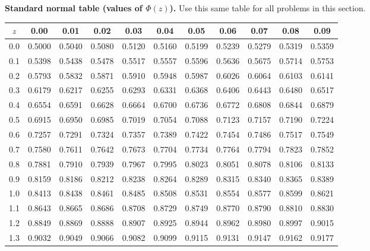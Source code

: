 



\noindent\textbf{Standard normal table (values of \(\Phi(z)\)).} Use this same table for all problems in this section.
\begin{center}
\begin{tabular}{c|cccccccccc}
	\toprule
	$z$ & 0.00 & 0.01 & 0.02 & 0.03 & 0.04 & 0.05 & 0.06 & 0.07 & 0.08 & 0.09 \\
	\midrule
	0.0 & 0.5000 & 0.5040 & 0.5080 & 0.5120 & 0.5160 & 0.5199 & 0.5239 & 0.5279 & 0.5319 & 0.5359 \\
	0.1 & 0.5398 & 0.5438 & 0.5478 & 0.5517 & 0.5557 & 0.5596 & 0.5636 & 0.5675 & 0.5714 & 0.5753 \\
	0.2 & 0.5793 & 0.5832 & 0.5871 & 0.5910 & 0.5948 & 0.5987 & 0.6026 & 0.6064 & 0.6103 & 0.6141 \\
	0.3 & 0.6179 & 0.6217 & 0.6255 & 0.6293 & 0.6331 & 0.6368 & 0.6406 & 0.6443 & 0.6480 & 0.6517 \\
	0.4 & 0.6554 & 0.6591 & 0.6628 & 0.6664 & 0.6700 & 0.6736 & 0.6772 & 0.6808 & 0.6844 & 0.6879 \\
	0.5 & 0.6915 & 0.6950 & 0.6985 & 0.7019 & 0.7054 & 0.7088 & 0.7123 & 0.7157 & 0.7190 & 0.7224 \\
	0.6 & 0.7257 & 0.7291 & 0.7324 & 0.7357 & 0.7389 & 0.7422 & 0.7454 & 0.7486 & 0.7517 & 0.7549 \\
	0.7 & 0.7580 & 0.7611 & 0.7642 & 0.7673 & 0.7704 & 0.7734 & 0.7764 & 0.7794 & 0.7823 & 0.7852 \\
	0.8 & 0.7881 & 0.7910 & 0.7939 & 0.7967 & 0.7995 & 0.8023 & 0.8051 & 0.8078 & 0.8106 & 0.8133 \\
	0.9 & 0.8159 & 0.8186 & 0.8212 & 0.8238 & 0.8264 & 0.8289 & 0.8315 & 0.8340 & 0.8365 & 0.8389 \\
	1.0 & 0.8413 & 0.8438 & 0.8461 & 0.8485 & 0.8508 & 0.8531 & 0.8554 & 0.8577 & 0.8599 & 0.8621 \\
	1.1 & 0.8643 & 0.8665 & 0.8686 & 0.8708 & 0.8729 & 0.8749 & 0.8770 & 0.8790 & 0.8810 & 0.8830 \\
	1.2 & 0.8849 & 0.8869 & 0.8888 & 0.8907 & 0.8925 & 0.8944 & 0.8962 & 0.8980 & 0.8997 & 0.9015 \\
	1.3 & 0.9032 & 0.9049 & 0.9066 & 0.9082 & 0.9099 & 0.9115 & 0.9131 & 0.9147 & 0.9162 & 0.9177 \\

\end{tabular}
\end{center}
